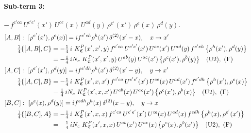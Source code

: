 \documentclass[10pt]{article}
\numberwithin{equation}{section}
\begin{document}
\paragraph{Sub-term 3:} $-\,f^{c'ca}\,U^{c'e'}(x')\,U^{ce}(x)\,U^{ad}(y)\,\rho^{e'}(x')\,\rho^{e}(x)\,\rho^{d}(y)$.
\begin{align}
&[A,B]:\ [\rho^{e'}(x'),\rho^{e}(x)]=i f^{e'eh}\rho^{h}(x')\,\delta^{(2)}(x'-x),\quad x\to x'\notag\\
&\qquad \tfrac14\{[A,B],C\}=-\tfrac14\,i\,\,K^{P}_{\mathfrak C}(x',x',y)\,f^{c'ca}\,U^{c'e'}(x')\,U^{ce}(x')\,U^{ad}(y)\,f^{e'eh}\,\big\{\rho^{h}(x'),\rho^{d}(y)\big\}\notag\\
&\qquad\phantom{\tfrac14\{[A,B],C\}}=-\tfrac14\,i N_{c}\,\,K^{P}_{\mathfrak C}(x',x',y)\,U^{ab}(y)\,U^{ac}(x')\,\big\{\rho^{c}(x'),\rho^{b}(y)\big\}\quad\text{(U2)},\ \text{(F)}
\label{B:eq:GIII.V.P-3-AB}\\
&[A,C]:\ [\rho^{e'}(x'),\rho^{d}(y)]=i f^{e'dh}\rho^{h}(x')\,\delta^{(2)}(x'-y),\quad y\to x'\notag\\
&\qquad \tfrac14\{[A,C],B\}=-\tfrac14\,i\,\,K^{P}_{\mathfrak C}(x',x,x')\,f^{c'ca}\,U^{c'e'}(x')\,U^{ce}(x)\,U^{ad}(x')\,f^{e'dh}\,\big\{\rho^{h}(x'),\rho^{e}(x)\big\}\notag\\
&\qquad\phantom{\tfrac14\{[A,C],B\}}=\tfrac14\,i N_{c}\,\,K^{P}_{\mathfrak C}(x',x,x')\,U^{ab}(x)\,U^{ac}(x')\,\big\{\rho^{c}(x'),\rho^{b}(x)\big\}\quad\text{(U2)},\ \text{(F)}
\label{B:eq:GIII.V.P-3-AC}\\
&[B,C]:\ [\rho^{e}(x),\rho^{d}(y)]=i f^{edh}\rho^{h}(x)\,\delta^{(2)}(x-y),\quad y\to x\notag\\
&\qquad \tfrac14\{[B,C],A\}=-\tfrac14\,i\,\,K^{P}_{\mathfrak C}(x',x,x)\,f^{c'ca}\,U^{c'e'}(x')\,U^{ce}(x)\,U^{ad}(x)\,f^{edh}\,\big\{\rho^{h}(x),\rho^{e'}(x')\big\}\notag\\
&\qquad\phantom{\tfrac14\{[B,C],A\}}=-\tfrac14\,i N_{c}\,\,K^{P}_{\mathfrak C}(x',x,x)\,U^{ab}(x')\,U^{ac}(x)\,\big\{\rho^{c}(x),\rho^{b}(x')\big\}\quad\text{(U2)},\ \text{(F)}
\label{B:eq:GIII.V.P-3-BC}
\end{align}
\end{document}

